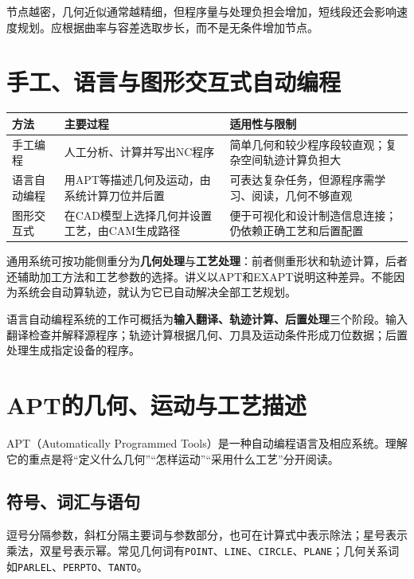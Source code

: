 节点越密，几何近似通常越精细，但程序量与处理负担会增加，短线段还会影响速度规划。应根据曲率与容差选取步长，而不是无条件增加节点。

\section{手工、语言与图形交互式自动编程}

\begin{center}
\begin{tabularx}{\linewidth}{@{}p{.18\linewidth}XX@{}}
\toprule
方法 & 主要过程 & 适用性与限制\\
\midrule
手工编程 & 人工分析、计算并写出NC程序 & 简单几何和较少程序段较直观；复杂空间轨迹计算负担大\\
语言自动编程 & 用APT等描述几何及运动，由系统计算刀位并后置 & 可表达复杂任务，但源程序需学习、阅读，几何不够直观\\
图形交互式 & 在CAD模型上选择几何并设置工艺，由CAM生成路径 & 便于可视化和设计制造信息连接；仍依赖正确工艺和后置配置\\
\bottomrule
\end{tabularx}
\end{center}

通用系统可按功能侧重分为\textbf{几何处理}与\textbf{工艺处理}：前者侧重形状和轨迹计算，后者还辅助加工方法和工艺参数的选择。讲义以APT和EXAPT说明这种差异。不能因为系统会自动算轨迹，就认为它已自动解决全部工艺规划。

语言自动编程系统的工作可概括为\textbf{输入翻译、轨迹计算、后置处理}三个阶段。输入翻译检查并解释源程序；轨迹计算根据几何、刀具及运动条件形成刀位数据；后置处理生成指定设备的程序。

\section{APT的几何、运动与工艺描述}

APT（Automatically Programmed Tools）是一种自动编程语言及相应系统。理解它的重点是将“定义什么几何”“怎样运动”“采用什么工艺”分开阅读。

\subsection{符号、词汇与语句}
逗号分隔参数，斜杠分隔主要词与参数部分，也可在计算式中表示除法；星号表示乘法，双星号表示幂。常见几何词有\texttt{POINT}、\texttt{LINE}、\texttt{CIRCLE}、\texttt{PLANE}；几何关系词如\texttt{PARLEL}、\texttt{PERPTO}、\texttt{TANTO}。

